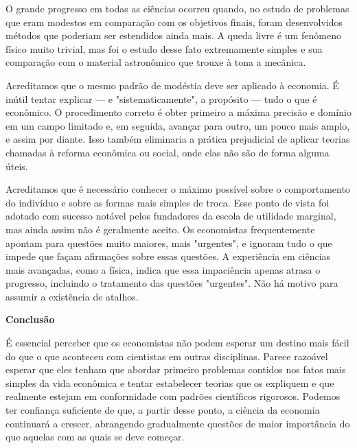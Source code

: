 \documentclass[12pt]{article}
\begin{document}
O grande progresso em todas as ciências ocorreu quando, no estudo de problemas que eram modestos em comparação com os objetivos finais, foram desenvolvidos métodos que poderiam ser estendidos ainda mais. A queda livre é um fenômeno físico muito trivial, mas foi o estudo desse fato extremamente simples e sua comparação com o material astronômico que trouxe à tona a mecânica.

Acreditamos que o mesmo padrão de modéstia deve ser aplicado à economia. É inútil tentar explicar — e "sistematicamente", a propósito — tudo o que é econômico. O procedimento correto é obter primeiro a máxima precisão e domínio em um campo limitado e, em seguida, avançar para outro, um pouco mais amplo, e assim por diante. Isso também eliminaria a prática prejudicial de aplicar teorias chamadas à reforma econômica ou social, onde elas não são de forma alguma úteis.

Acreditamos que é necessário conhecer o máximo possível sobre o comportamento do indivíduo e sobre as formas mais simples de troca. Esse ponto de vista foi adotado com sucesso notável pelos fundadores da escola de utilidade marginal, mas ainda assim não é geralmente aceito. Os economistas frequentemente apontam para questões muito maiores, mais "urgentes", e ignoram tudo o que impede que façam afirmações sobre essas questões. A experiência em ciências mais avançadas, como a física, indica que essa impaciência apenas atrasa o progresso, incluindo o tratamento das questões "urgentes". Não há motivo para assumir a existência de atalhos.

\textbf{Conclusão}

É essencial perceber que os economistas não podem esperar um destino mais fácil do que o que aconteceu com cientistas em outras disciplinas. Parece razoável esperar que eles tenham que abordar primeiro problemas contidos nos fatos mais simples da vida econômica e tentar estabelecer teorias que os expliquem e que realmente estejam em conformidade com padrões científicos rigorosos. Podemos ter confiança suficiente de que, a partir desse ponto, a ciência da economia continuará a crescer, abrangendo gradualmente questões de maior importância do que aquelas com as quais se deve começar.
\end{document}
